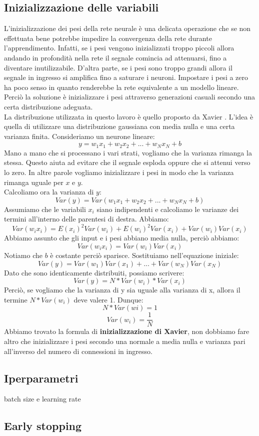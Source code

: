 \subsection{Inizializzazione delle variabili}
L'inizializzazione dei pesi della rete neurale è una delicata operazione che se non effettuata bene potrebbe impedire la convergenza della rete durante l'apprendimento. Infatti, se i pesi vengono inizializzati troppo piccoli allora andando in profondità nella rete il segnale comincia ad attenuarsi, fino a diventare inutilizzabile. D'altra parte, se i pesi sono troppo grandi allora il segnale in ingresso si amplifica fino a saturare i neuroni. Impostare i pesi a zero ha poco senso in quanto renderebbe la rete equivalente a un modello lineare. Perciò la soluzione è inizializzare i pesi attraverso generazioni casuali secondo una certa distribuzione adeguata.\\
La distribuzione utilizzata in questo lavoro è quello proposto da Xavier \cite{xavier}. L'idea è quella di utilizzare una distribuzione gaussiana con media nulla e una certa varianza finita. Consideriamo un neurone lineare:
$$y = w_1 x_1 + w_2 x_2 + ... + w_N x_N + b$$
Mano a mano che si processano i vari strati, vogliamo che la varianza rimanga la stessa. Questo aiuta ad evitare che il segnale esploda oppure che si attenui verso lo zero. In altre parole vogliamo inizializzare i pesi in modo che la varianza rimanga uguale per $x$ e $y$.\\
Calcoliamo ora la varianza di $y$:
$$Var(y) = Var(w_1x_1 + w_2x_2 + ... + w_Nx_N + b)$$
Assumiamo che le variabili $x_i$ siano indipendenti e calcoliamo le varianze dei termini all'interno delle parentesi di destra. Abbiamo:
$$Var(w_ix_i) = E(x_i)^2Var(w_i) + E(w_i)^2Var(x_i) + Var(w_i)Var(x_i)$$
Abbiamo assunto che gli input e i pesi abbiano media nulla, perciò abbiamo:
$$Var(w_ix_i) = Var(w_i)Var(x_i)$$
Notiamo che $b$ è costante perciò sparisce. Sostituiamo nell'equazione iniziale:
$$Var(y) = Var(w_1)Var(x_1) + ... + Var(w_N)Var(x_N)$$
Dato che sono identicamente distribuiti, possiamo scrivere:
$$Var(y) = N * Var(w_i) * Var(x_i)$$
Perciò, se vogliamo che la varianza di y sia uguale alla varianza di x, allora il termine $N*Var(w_i)$ deve valere 1. Dunque:
$$N * Var(wi) = 1$$
$$Var(w_i) = \frac{1}{N}$$
Abbiamo trovato la formula di \textbf{inizializzazione di Xavier}, non dobbiamo fare altro che inizializzare i pesi secondo una normale a media nulla e varianza pari all'inverso del numero di connessioni in ingresso.

\subsection{Iperparametri}
batch size e learning rate
\subsection{Early stopping}
